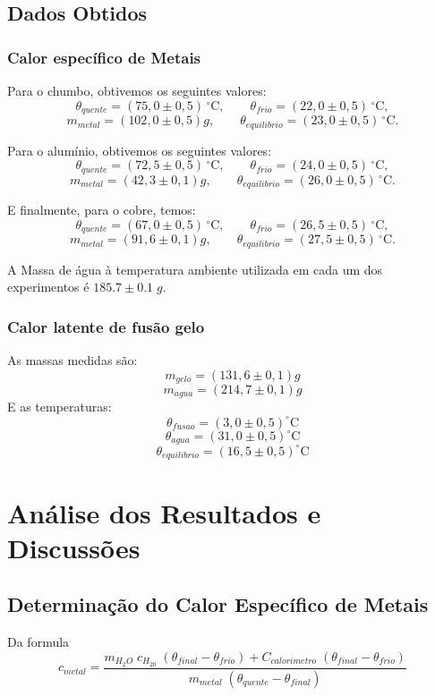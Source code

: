 \documentclass[12pt,a4paper]{article}
\begin{document}
\subsection{Dados Obtidos}
\subsubsection{Calor específico de Metais}
Para o chumbo, obtivemos os seguintes valores:
$$ \theta_{quente} = (75,0 \pm 0,5)\,^{\circ}\mathrm{C}, \qquad \theta_{frio} = (22,0 \pm 0,5)\,^{\circ}\mathrm{C}, $$
$$ m_{metal} = (102,0 \pm 0,5)g, \qquad \theta_{equilibrio} = (23,0 \pm 0,5)\,^{\circ}\mathrm{C}. $$


Para o alumínio, obtivemos os seguintes valores:
$$ \theta_{quente} = (72,5 \pm 0,5)\,^{\circ}\mathrm{C}, \qquad \theta_{frio} = (24,0 \pm 0,5)\,^{\circ}\mathrm{C}, $$
$$ m_{metal} = (42,3 \pm 0,1)g, \qquad \theta_{equilibrio} = (26,0 \pm 0,5)\,^{\circ}\mathrm{C}. $$


 E finalmente, para o cobre, temos:
$$ \theta_{quente} = (67,0 \pm 0,5)\,^{\circ}\mathrm{C}, \qquad \theta_{frio} = (26,5 \pm 0,5)\,^{\circ}\mathrm{C}, $$
$$ m_{metal} = (91,6 \pm 0,1)g, \qquad \theta_{equilibrio} = (27,5 \pm 0,5)\,^{\circ}\mathrm{C}. $$

A Massa de água à temperatura ambiente utilizada em cada um dos experimentos é $185.7 \pm 0.1 \; g$.

\subsubsection{Calor latente de fusão gelo}
As massas medidas são:
$$ m_{gelo} = (131,6 \pm 0,1) g $$
$$ m_{agua} = (214,7 \pm 0,1)g $$
E as temperaturas:
$$ \theta_{fusao} = (3,0 \pm 0,5)^{\circ}\mathrm{C} $$
$$ \theta_{agua} = (31,0 \pm 0,5)^{\circ}\mathrm{C} $$
$$ \theta_{equilibrio} = (16,5 \pm 0,5)^{\circ}\mathrm{C} $$
\section{Análise dos Resultados e Discussões}

\subsection{Determinação do Calor Específico de Metais}
Da formula 
$$c_{metal} = \frac{m_{H_2O} \; c_{H_20} \;  (\theta_{final} - \theta_{frio}) + C_{calorimetro} \; (\theta_{final} - \theta_{frio})}{m_{metal} \;(\theta_{quente} - \theta_{final})}$$\
\end{document}
